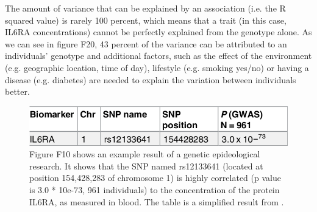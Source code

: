 The amount of variance that can be explained by an association (i.e.
the R squared value) is rarely 100 percent, which means that a trait (in
this case, IL6RA concentrations) cannot be perfectly explained
from the genotype alone. As we can see in figure F20, 
43 percent of the variance can be attributed to an individuals'
genotype and additional factors, 
such as the effect
of the environment (e.g. geographic location, time of day), 
lifestyle (e.g. smoking yes/no) or having a disease (e.g. diabetes) 
are needed to explain the variation between individuals better.

\begin{figure}[!htbp]
  \centering
  \includegraphics[width=\linewidth]{ahsan2017relative_table_2_sub.png}
  \caption{
    Figure F10 shows an example result of a genetic epideological research.
    It shows that the SNP named rs12133641 (located at position 154,428,283
    of chromosome 1) is highly correlated (p value is 3.0 * 10e-73, 
    961 individuals) to the concentration of the protein IL6RA, as measured
    in blood. The table is a simplified result from \cite{ahsan2017relative}.
  }
  \label{fig:ahsan2017relative_table_2_sub}
\end{figure}


